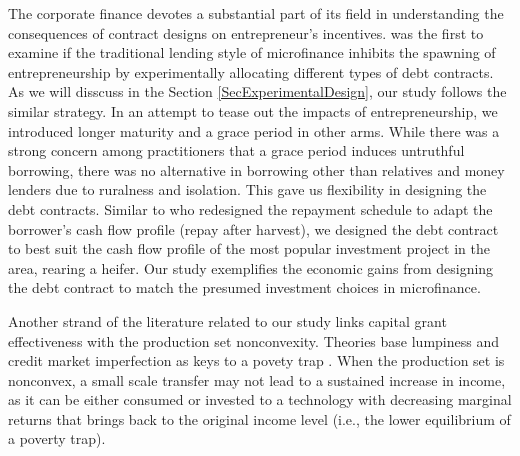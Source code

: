 	The corporate finance devotes a substantial part of its field in understanding the consequences of contract designs on entrepreneur's incentives. \citet{Field2013} was the first to examine if the traditional lending style of microfinance inhibits the spawning of entrepreneurship by experimentally allocating different types of debt contracts.  %
	As we will disscuss in the Section \ref{SecExperimentalDesign}, our study follows the similar strategy. In an attempt to tease out the impacts of entrepreneurship, we introduced longer maturity and a grace period in other arms. While there was a strong concern among practitioners that a grace period induces untruthful borrowing, there was no alternative in borrowing other than relatives and money lenders due to ruralness and isolation. This gave us flexibility in designing the debt contracts. Similar to \citet{Beaman2015} who redesigned the repayment schedule to adapt the borrower's cash flow profile (repay after harvest), we designed the debt contract to best suit the cash flow profile of the most popular investment project in the area, rearing a heifer. %
	Our study exemplifies the economic gains from designing the debt contract to match the presumed investment choices in microfinance.

	Another strand of the literature related to our study links capital grant effectiveness with the production set nonconvexity. Theories base lumpiness and credit market imperfection as keys to a povety trap \citep[e.g., ][]{GalorZeira1993}. When the production set is nonconvex, a small scale transfer may not lead to a sustained increase in income, as it can be either consumed or invested to a technology with decreasing marginal returns that brings back to the original income level (i.e., the lower equilibrium of a poverty trap). 
	
